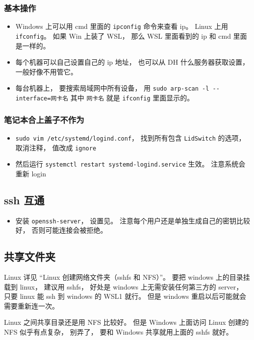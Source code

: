 \subsubsection{基本操作}
\begin{itemize}
\item Windows 上可以用 cmd 里面的 \verb|ipconfig| 命令来查看 ip。 Linux 上用 \verb|ifconfig|。 如果 Win 上装了 WSL， 那么 WSL 里面看到的 ip 和 cmd 里面是一样的。
\item 每个机器可以自己设置自己的 ip 地址， 也可以从 DH 什么服务器获取设置， 一般好像不用管它。
\item 每台机器上， 要搜索局域网中所有设备， 用 \verb|sudo arp-scan -l --interface=网卡名| 其中 \verb|网卡名| 就是 \verb|ifconfig| 里面显示的。
\end{itemize}

\subsubsection{笔记本合上盖子不作为}
\begin{itemize}
\item \verb|sudo vim /etc/systemd/logind.conf|， 找到所有包含 \verb|LidSwitch| 的选项， 取消注释， 值改成 \verb|ignore|
\item 然后运行 \verb|systemctl restart systemd-logind.service| 生效。 注意系统会重新 login
\end{itemize}


\subsection{ssh 互通}
\begin{itemize}
\item 安装 \verb|openssh-server|， 设置见。 注意每个用户还是单独生成自己的密钥比较好， 否则可能连接会被拒绝。
\end{itemize}

\subsection{共享文件夹}
Linux 详见 “Linux 创建网络文件夹（sshfs 和 NFS）”。 要把 windows 上的目录挂载到 linux， 建议用 sshfs， 好处是 windows 上无需安装任何第三方的 server， 只要 linux 能 ssh 到 windows 的 WSL1 就行。 但是 windows 重启以后可能就会需要重新连一次。

Linux 之间共享目录还是用 NFS 比较好。 但是 Windows 上面访问 Linux 创建的 NFS 似乎有点复杂， 别弄了， 要和 Windows 共享就用上面的 sshfs 就好。

